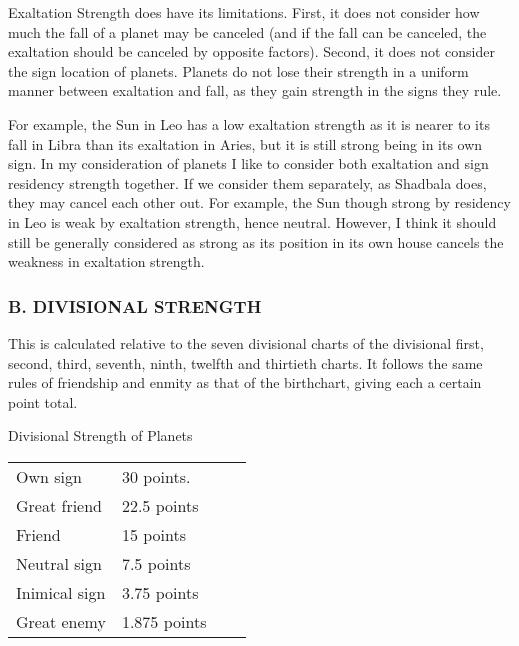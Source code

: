 Exaltation Strength does have its limitations. First, it does not consider how much the fall of a planet may be canceled (and if the fall can be canceled, the exaltation should be canceled by opposite factors). Second, it does not consider the sign location of planets. Planets do not lose their strength in a uniform manner between exaltation and fall, as they gain strength in the signs they rule.

 

For example, the Sun in Leo has a low exaltation strength as it is nearer to its fall in Libra than its exaltation in Aries, but it is still strong being in its own sign. In my consideration of planets I like to consider both exaltation and sign residency strength together. If we consider them separately, as Shadbala does, they may cancel each other out. For example, the Sun though strong by residency in Leo is weak by exaltation strength, hence neutral. However, I think it should still be generally considered as strong as its position in its own house cancels the weakness in exaltation strength.

 

\subsubsection{B. DIVISIONAL STRENGTH}

 

This is calculated relative to the seven divisional charts of the divisional first, second, third, seventh, ninth, twelfth and thirtieth charts. It follows the same rules of friendship and enmity as that of the birthchart, giving each a certain point total.

 

Divisional Strength of Planets

\begin{center}
\begin{tabular}{ l l l l}
Own sign	& 30 points.                 \\
Great friend	 &22.5 points                \\
Friend	 &15 points                \\
Neutral sign	 &7.5 points                \\
Inimical sign	 &3.75 points                \\
Great enemy	 &1.875 points                \\
\end{tabular}
\end{center}
 

